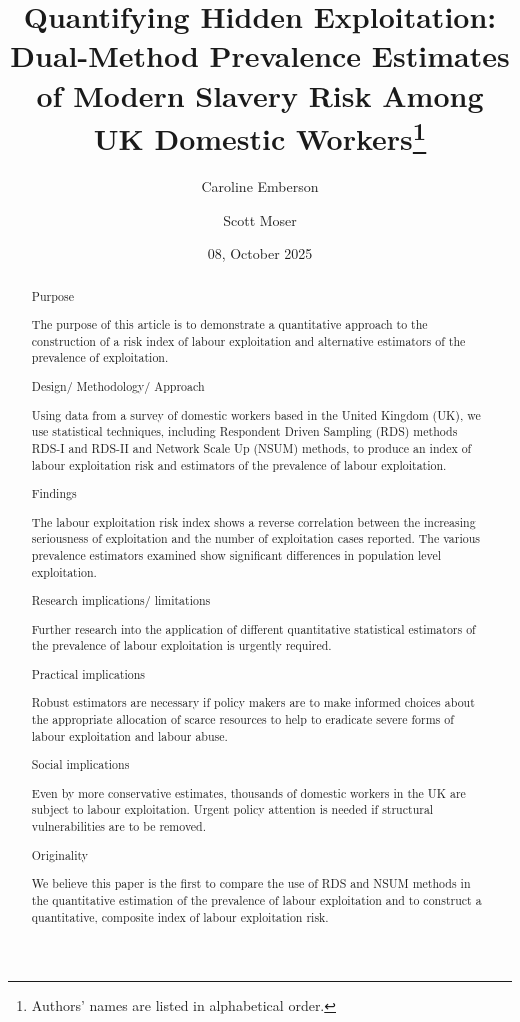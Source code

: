 \documentclass[
  12pt,
  letterpaper,
  DIV=11,
  numbers=noendperiod]{scrartcl}
\title{Quantifying Hidden Exploitation: Dual-Method Prevalence Estimates
of Modern Slavery Risk Among UK Domestic Workers\footnote{Authors' names
  are listed in alphabetical order.}}
\author{Caroline Emberson \and Scott Moser}
\date{08, October 2025}
\theoremstyle{plain}
\theoremstyle{definition}
\renewcommand*\contentsname{Table of contents}
\newcommand\contentsname{Table of contents}
\begin{document}
\maketitle
\begin{abstract}
Purpose

The purpose of this article is to demonstrate a quantitative approach to
the construction of a risk index of labour exploitation and alternative
estimators of the prevalence of exploitation.

Design/ Methodology/ Approach

Using data from a survey of domestic workers based in the United Kingdom
(UK), we use statistical techniques, including Respondent Driven
Sampling (RDS) methods RDS-I and RDS-II and Network Scale Up (NSUM)
methods, to produce an index of labour exploitation risk and estimators
of the prevalence of labour exploitation.

Findings

The labour exploitation risk index shows a reverse correlation between
the increasing seriousness of exploitation and the number of
exploitation cases reported. The various prevalence estimators examined
show significant differences in population level exploitation.

Research implications/ limitations

Further research into the application of different quantitative
statistical estimators of the prevalence of labour exploitation is
urgently required.

Practical implications

Robust estimators are necessary if policy makers are to make informed
choices about the appropriate allocation of scarce resources to help to
eradicate severe forms of labour exploitation and labour abuse.

Social implications

Even by more conservative estimates, thousands of domestic workers in
the UK are subject to labour exploitation. Urgent policy attention is
needed if structural vulnerabilities are to be removed.

Originality

We believe this paper is the first to compare the use of RDS and NSUM
methods in the quantitative estimation of the prevalence of labour
exploitation and to construct a quantitative, composite index of labour
exploitation risk.
\end{abstract}

\renewcommand*\contentsname{Table of contents}
{
\hypersetup{linkcolor=}
\setcounter{tocdepth}{3}
\tableofcontents
}
\end{document}
